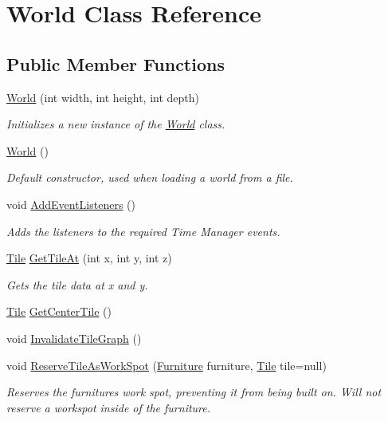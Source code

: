 \hypertarget{class_world}{}\section{World Class Reference}
\label{class_world}
\subsection*{Public Member Functions}
\begin{DoxyCompactItemize}
\item 
\hyperlink{class_world_a4ec5a28e3d60acbe09b6bc266803007a}{World} (int width, int height, int depth)
\begin{DoxyCompactList}\small\item\em Initializes a new instance of the \hyperlink{class_world}{World} class. \end{DoxyCompactList}\item 
\hyperlink{class_world_a0f295f73a017f396d396f0ab4b5a35bc}{World} ()
\begin{DoxyCompactList}\small\item\em Default constructor, used when loading a world from a file. \end{DoxyCompactList}\item 
void \hyperlink{class_world_a0d841bc2e07742a33176443373670eae}{Add\+Event\+Listeners} ()
\begin{DoxyCompactList}\small\item\em Adds the listeners to the required Time Manager events. \end{DoxyCompactList}\item 
\hyperlink{class_tile}{Tile} \hyperlink{class_world_aeff2ae07aa8dcbe54fb9386ca043398c}{Get\+Tile\+At} (int x, int y, int z)
\begin{DoxyCompactList}\small\item\em Gets the tile data at x and y. \end{DoxyCompactList}\item 
\hyperlink{class_tile}{Tile} \hyperlink{class_world_ac608bea85e2936e7170eaa0d31c9dcb8}{Get\+Center\+Tile} ()
\item 
void \hyperlink{class_world_a2524f9708b9e9e92804c7569ebf97ba8}{Invalidate\+Tile\+Graph} ()
\item 
void \hyperlink{class_world_afa0c55901cb90c6876f7e1b3b08e7aa5}{Reserve\+Tile\+As\+Work\+Spot} (\hyperlink{class_furniture}{Furniture} furniture, \hyperlink{class_tile}{Tile} tile=null)
\begin{DoxyCompactList}\small\item\em Reserves the furniture\textquotesingle{}s work spot, preventing it from being built on. Will not reserve a workspot inside of the furniture. \end{DoxyCompactList}\item 

\end{DoxyCompactItemize}

